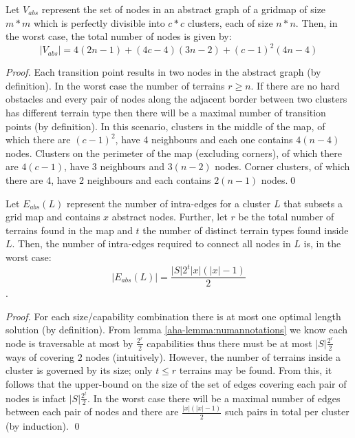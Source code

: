\begin{lemma}
\label{aha-lemma:maxnodes}
Let $V_{abs}$ represent the set of nodes in an abstract graph of a gridmap of size $m*m$ which is perfectly divisible into $c*c$ clusters, each of size $n*n$. Then, in the worst case, the total number of nodes is given by:
$$|V_{abs}| = 4(2n-1) + (4c - 4)(3n-2) + (c-1)^2(4n-4)$$
\end{lemma}

\begin{proof}
Each transition point results in two nodes in the abstract graph (by definition). 
In the worst case the number of terrains $r \geq n$. 
If there are no hard obstacles and every pair of nodes along the adjacent border between two clusters has different terrain type then there will be a maximal number of transition points (by definition). 
In this scenario, clusters in the middle of the map, of which there are $(c-1)^2$, have 4 neighbours and each one contains $4(n-4)$ nodes. 
Clusters on the perimeter of the map (excluding corners), of which there are $4(c-1)$, have 3 neighbours and $3(n-2)$ nodes. 
Corner clusters, of which there are 4, have 2 neighbours and each contains $2(n-1)$ nodes.\qed
\end{proof}

\begin{lemma}
\label{aha-lemma:maxedgesincluster}
Let $E_{abs}(L)$ represent the number of intra-edges for a cluster $L$ that subsets a grid map and contains $x$ abstract nodes. Further, let $r$ be the total number of terrains found in the map and $t$ the number of distinct terrain types found inside $L$. Then, the number of intra-edges required to connect all nodes in $L$ is, in the worst case:
 $$|E_{abs}(L)| = \frac{|S|2^t|x|(|x|-1)}{2}$$.
\end{lemma}

\begin{proof}
For each size/capability combination there is at most one optimal length solution (by definition). From lemma \ref{aha-lemma:numannotations} we know each node is traversable at most by $\frac{2^r}{2}$ capabilities thus there must be at most $|S|\frac{2^r}{2} $ ways of covering 2 nodes (intuitively). 
However, the number of terrains inside a cluster is governed by its size; only $t \leq r$ terrains may be found. From this, it follows that the upper-bound on the size of the set of edges covering each pair of nodes is infact $|S|\frac{2^t}{2}$. In the worst case there will be a maximal number of edges between each pair of nodes and there are $\frac{|x|(|x|-1)}{2}$ such pairs in total per cluster (by induction). \qed
\end{proof}

